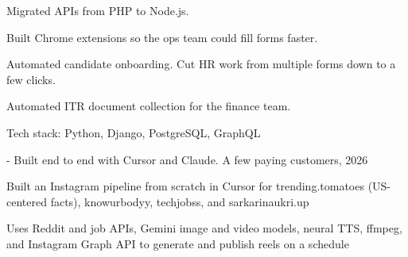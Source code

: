 \documentclass[]{deep-resume-openfont}
\begin{document}
\begin{minipage}[t]{0.66\textwidth}

\entrysep
\begin{tightemize}
\item Migrated  APIs from PHP to Node.js.
\item Built Chrome extensions so the ops team could fill forms faster.
\item Automated candidate onboarding. Cut HR work from multiple forms down to a few clicks.
\item Automated ITR document collection for the finance team.
\item Tech stack: Python, Django, PostgreSQL, GraphQL
\end{tightemize}

\begin{tightemize}
\item {} - Built end to end with Cursor and Claude. A few paying customers, 2026
\item Built an Instagram pipeline from scratch in Cursor for trending.tomatoes (US-centered facts), knowurbodyy, techjobss, and sarkarinaukri.up
\item Uses Reddit and job APIs, Gemini image and video models, neural TTS, ffmpeg, and Instagram Graph API to generate and publish reels on a schedule
\end{tightemize}

\end{minipage}
\end{document}

